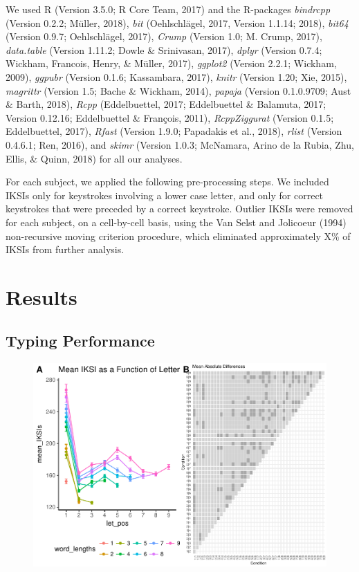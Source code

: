 \documentclass[floatsintext,man]{apa6}
\theoremstyle{definition}
\theoremstyle{definition}
\theoremstyle{definition}
\theoremstyle{remark}
\begin{document}
We used R (Version 3.5.0; R Core Team, 2017) and the R-packages
\emph{bindrcpp} (Version 0.2.2; Müller, 2018), \emph{bit} (Oehlschlägel,
2017, Version 1.1.14; 2018), \emph{bit64} (Version 0.9.7; Oehlschlägel,
2017), \emph{Crump} (Version 1.0; M. Crump, 2017), \emph{data.table}
(Version 1.11.2; Dowle \& Srinivasan, 2017), \emph{dplyr} (Version
0.7.4; Wickham, Francois, Henry, \& Müller, 2017), \emph{ggplot2}
(Version 2.2.1; Wickham, 2009), \emph{ggpubr} (Version 0.1.6;
Kassambara, 2017), \emph{knitr} (Version 1.20; Xie, 2015),
\emph{magrittr} (Version 1.5; Bache \& Wickham, 2014), \emph{papaja}
(Version 0.1.0.9709; Aust \& Barth, 2018), \emph{Rcpp} (Eddelbuettel,
2017; Eddelbuettel \& Balamuta, 2017; Version 0.12.16; Eddelbuettel \&
François, 2011), \emph{RcppZiggurat} (Version 0.1.5; Eddelbuettel,
2017), \emph{Rfast} (Version 1.9.0; Papadakis et al., 2018),
\emph{rlist} (Version 0.4.6.1; Ren, 2016), and \emph{skimr} (Version
1.0.3; McNamara, Arino de la Rubia, Zhu, Ellis, \& Quinn, 2018) for all
our analyses.

For each subject, we applied the following pre-processing steps. We
included IKSIs only for keystrokes involving a lower case letter, and
only for correct keystrokes that were preceded by a correct keystroke.
Outlier IKSIs were removed for each subject, on a cell-by-cell basis,
using the Van Selst and Jolicoeur (1994) non-recursive moving criterion
procedure, which eliminated approximately X\% of IKSIs from further
analysis.

\section{Results}\label{results}

\subsection{Typing Performance}\label{typing-performance}

\begin{figure}
\centering
\includegraphics{Entropy_typing_draft_files/figure-latex/typing_mean_iksis_comparisons-1.pdf}
\caption{}
\end{figure}
\end{document}
